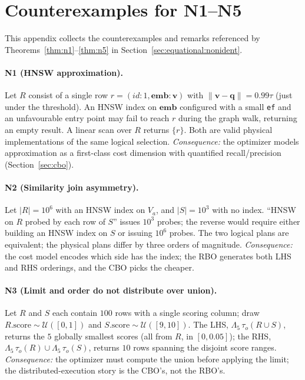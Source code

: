 \documentclass[sigconf]{acmart}
\theoremstyle{plain}
\theoremstyle{definition}
\newcommand{\vect}[1]{\boldsymbol{#1}}
\theoremstyle{remark}
\begin{document}
\section{Counterexamples for N1--N5}\label{app:ncex}

This appendix collects the counterexamples and remarks referenced
by Theorems~\ref{thm:n1}--\ref{thm:n5} in
Section~\ref{sec:equational:nonident}.

\paragraph{N1 (HNSW approximation).}
Let $R$ consist of a single row $r = (\mathit{id}: 1, \vect{emb}:
\vect{v})$ with $\lVert \vect{v} - \vect{q} \rVert = 0.99\tau$ (just
under the threshold). An HNSW index on $\vect{emb}$ configured with a
small \texttt{ef} and an unfavourable entry point may fail to reach
$r$ during the graph walk, returning an empty result. A linear scan
over $R$ returns $\{r\}$. Both are valid physical implementations of
the same logical selection. \emph{Consequence:} the optimizer models
approximation as a first-class cost dimension with quantified
recall/precision (Section~\ref{sec:cbo}).

\paragraph{N2 (Similarity join asymmetry).}
Let $|R| = 10^6$ with an HNSW index on $V_a$, and $|S| = 10^3$ with
no index. ``HNSW on $R$ probed by each row of $S$'' issues $10^3$
probes; the reverse would require either building an HNSW index on
$S$ or issuing $10^6$ probes. The two logical plans are equivalent;
the physical plans differ by three orders of magnitude. \emph{Consequence:}
the cost model encodes which side has the index; the RBO generates
both LHS and RHS orderings, and the CBO picks the cheaper.

\paragraph{N3 (Limit and order do not distribute over union).}
Let $R$ and $S$ each contain $100$ rows with a single scoring column;
draw $R.\mathrm{score} \sim \mathcal{U}([0,1])$ and
$S.\mathrm{score} \sim \mathcal{U}([9,10])$. The LHS,
$\Lambda_5\, \tau_o(R \cup S)$, returns the $5$ globally smallest
scores (all from $R$, in $[0, 0.05]$); the RHS,
$\Lambda_5\, \tau_o(R) \cup \Lambda_5\, \tau_o(S)$, returns
$10$ rows spanning the disjoint score ranges. \emph{Consequence:}
the optimizer must compute the union before applying the limit; the
distributed-execution story is the CBO's, not the RBO's.
\end{document}

